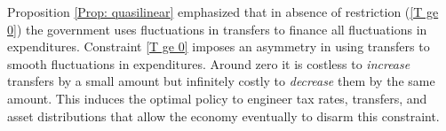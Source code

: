 \documentclass[thmsb,11pt]{article}
\begin{document}
Proposition \ref{Prop: quasilinear} emphasized that in absence of restriction (\ref{T ge 0}) the government uses fluctuations in transfers to finance all fluctuations in expenditures.  Constraint \eqref{T ge 0} imposes an asymmetry in using transfers to smooth fluctuations in expenditures. Around zero it is costless to {\em increase} transfers by a small amount but infinitely costly to {\em decrease} them by the same amount. This induces the optimal policy to engineer tax rates, transfers,  and asset distributions that allow the economy eventually to  disarm this constraint.
%
%
%
%
\end{document}
